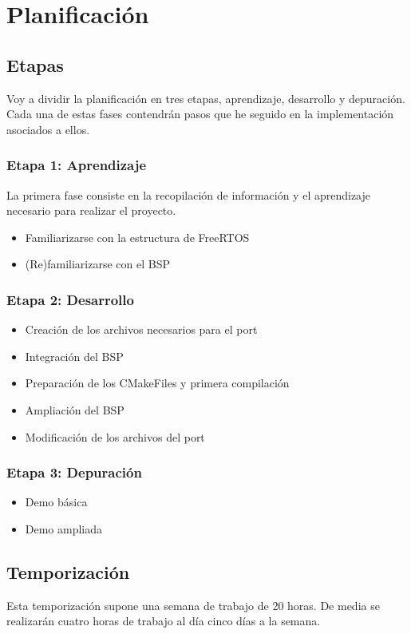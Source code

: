 \chapter{Planificación}

\section{Etapas}

Voy a dividir la planificación en tres etapas, aprendizaje, desarrollo y depuración. Cada una de estas fases contendrán pasos que he seguido en la implementación asociados a ellos.

\subsection{Etapa 1: Aprendizaje}
La primera fase consiste en la recopilación de información y el aprendizaje necesario para realizar el proyecto.

\begin{itemize}
\item Familiarizarse con la estructura de FreeRTOS
\item (Re)familiarizarse con el BSP
\end{itemize}

\subsection{Etapa 2: Desarrollo}
\begin{itemize}
\item Creación de los archivos necesarios para el port
\item Integración del BSP
\item Preparación de los CMakeFiles y primera compilación
\item Ampliación del BSP
\item Modificación de los archivos del port
\end{itemize}

\subsection{Etapa 3: Depuración}
\begin{itemize}
\item Demo básica
\item Demo ampliada
\end{itemize}

\section{Temporización}
Esta temporización supone una semana de trabajo de 20 horas. De media se realizarán cuatro horas de trabajo al día cinco días a la semana.

